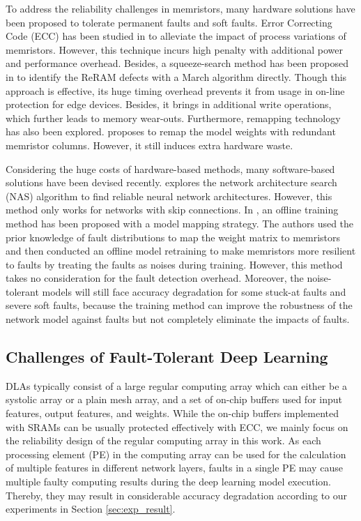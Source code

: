 To address the reliability challenges in memristors, many hardware solutions have been proposed to tolerate permanent faults and soft faults. Error Correcting Code (ECC) has been studied in \cite{6165062} to alleviate the impact of process variations of memristors. However, this technique incurs high penalty with additional power and performance overhead. Besides, a squeeze-search method has been proposed in  \cite{6725492} to identify the ReRAM defects with a March algorithm directly. Though this approach is effective, its huge timing overhead prevents it from usage in on-line protection for edge devices. Besides, it brings in additional write operations, which further leads to memory wear-outs. Furthermore, remapping technology has also been explored. \cite{8119491} proposes to remap the model weights with redundant memristor columns. However, it still induces extra hardware waste.
                
Considering the huge costs of hardware-based methods, many software-based solutions have been devised recently. \cite{ning2020ftt} explores the network architecture search (NAS) algorithm to find reliable neural network architectures. However, this method only works for networks with skip connections. In \cite{7926952}, an offline training method has been proposed with a model mapping strategy. The authors used the prior knowledge of fault distributions to map the weight matrix to memristors and then conducted an offline model retraining to make memristors more resilient to faults by treating the faults as noises during training.  However, this method takes no consideration for the fault detection overhead. Moreover, the noise-tolerant models will still face accuracy degradation for some stuck-at faults and severe soft faults, because the training method can improve the robustness of the network model against faults but not completely eliminate the impacts of faults. 


\subsection{Challenges of Fault-Tolerant Deep Learning}
DLAs typically consist of a large regular computing array which can either be a systolic array or a plain mesh array\cite{jouppi2017datacenter, Chen2016Eyeriss}, and a set of on-chip buffers used for input features, output features, and weights. While the on-chip buffers implemented with SRAMs can be usually protected effectively with ECC, we mainly focus on the reliability design of the regular computing array in this work. As each processing element (PE) in the computing array can be used for the calculation of multiple features in different network layers, faults in a single PE may cause multiple faulty computing results during the deep learning model execution. Thereby, they may result in considerable accuracy degradation according to our experiments in Section \ref{sec:exp_result}. 

